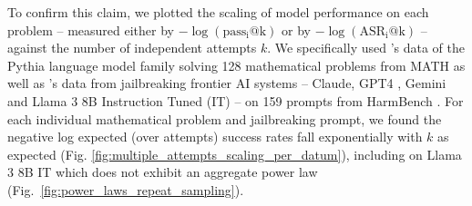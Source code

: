 To confirm this claim, we plotted the scaling of model performance on each problem -- measured either by $-\log(\operatorname{pass_i@k})$ or by $-\log(\operatorname{ASR_i@k})$ -- against the number of independent attempts $k$. We specifically used \citet{brown2024largelanguagemonkeysscaling}'s data of the Pythia language model family \citep{biderman2023pythia} solving 128 mathematical problems from MATH \citet{hendrycks2021measuring} as well as \citet{hughes2024bestofnjailbreaking}'s data from jailbreaking frontier AI systems -- Claude, GPT4 \citep{openai2024gpt4technicalreport}, Gemini \citep{anil2024geminifamilyhighlycapable,georgievgemini15unlockingmultimodal} and Llama 3 8B Instruction Tuned (IT) \citep{grattafiori2024llama3herdmodels} -- on 159 prompts from HarmBench \citep{mazeika2024harmbenchstandardizedevaluationframework}.
For each individual mathematical problem and jailbreaking prompt, we found the negative log expected (over attempts) success rates fall exponentially with $k$ as expected (Fig. \ref{fig:multiple_attempts_scaling_per_datum}), including on Llama 3 8B IT which does not exhibit an aggregate power law (Fig.~\ref{fig:power_laws_repeat_sampling}).